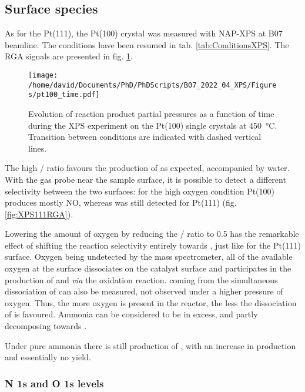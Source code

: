 \subsection{Surface species}

As for the Pt(111), the Pt(100) crystal was measured with NAP-XPS at B07 beamline.
The conditions have been resumed in tab. \ref{tab:ConditionsXPS}.
The RGA signals are presented in fig. \ref{fig:XPS100RGA}.

\begin{figure}[!htb]
    \centering
    \texttt{[image: /home/david/Documents/PhD/PhDScripts/B07\_2022\_04\_XPS/Figures/pt100\_time.pdf]}
    \caption{
        Evolution of reaction product partial pressures as a function of time during the XPS experiment on the Pt(100) single crystals at \qty{450}{\degreeCelsius}.
        Transition between conditions are indicated with dashed vertical lines.
    }
    \label{fig:XPS100RGA}
\end{figure}

The high / ratio favours the production of  as expected, accompanied by water.
With the gas probe near the sample surface, it is possible to detect a different selectivity between the two surfaces: for the high oxygen condition Pt(100) produces mostly NO, whereas  was still detected for Pt(111) (fig. \ref{fig:XPS111RGA}).

Lowering the amount of oxygen by reducing the / ratio to \num{0.5} has the remarkable effect of shifting the reaction selectivity entirely towards , just like for the Pt(111) surface.
Oxygen being undetected by the mass spectrometer, all of the available oxygen at the surface dissociates on the catalyst surface and participates in the production of  and  \textit{via} the oxidation reaction.
 coming from the simultaneous dissociation of  can also be measured, not observed under a higher pressure of oxygen.
Thus, the more oxygen is present in the reactor, the less the dissociation of  is favoured.
Ammonia can be considered to be in excess, and partly decomposing towards .

Under pure ammonia there is still production of , with an increase in  production and essentially no  yield.

\subsubsection{N 1s and O 1s levels}

